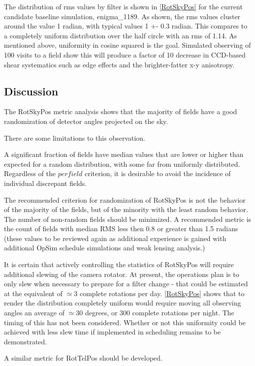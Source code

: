 The distribution of rms values by filter is shown in
\autoref{RotSkyPos} for the current candidate baseline simulation,
enigma\_1189.  As shown, the rms values cluster around the value 1
radian,  with typical values 1 +- 0.3 radian.  This compares to a
completely uniform distribution over the half circle with an rms of
1.14.  As mentioned above, uniformity in cosine squared is the goal.
Simulated observing of 100 visits to a field show this will produce
a factor of 10 decrease in CCD-based shear systematics such as edge
effects and the brighter-fatter x-y anisotropy.

\subsection{Discussion}

The RotSkyPos metric analysis shows that the majority of fields have a
good randomization of detector angles projected on the sky.

There are some limitations to this observation.


A significant fraction of fields  have median values that are
lower or higher than expected for a random distribution, with some far
from uniformly distributed.  Regardless of the $per field$ criterion,
it is desirable to avoid the incidence of individual discrepant
fields.

The recommended criterion for randomization of RotSkyPos is not the
behavior of the majority of the fields, but of the minority with the
least random behavior.  The number of non-random fields should be
minimized.  A recommended metric is the count of fields with median
RMS less then 0.8 or greater than 1.5 radians (these values to be
reviewed again as additional experience is gained with additional
OpSim schedule simulations and weak lensing analysis.)

It is certain that actively controlling the statistics of RotSkyPos
will require additional slewing of the camera rotator.  At present,
the operations plan is to only slew when necessary to prepare for a
filter change - that could be estimated at the equivalent of $\simeq
3$ complete rotations per day.  \autoref{RotSkyPos} shows that to
render the distribution completely uniform would require moving all
observing angles an average of $\simeq 30$ degrees, or 300 complete
rotations per night.  The timing of this has not been considered.
Whether or not this uniformity could be achieved with less slew time
if implemented in scheduling remains to be demonstrated.

A similar metric for RotTelPos should be developed.
